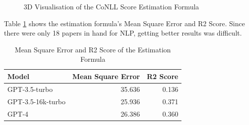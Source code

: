 \begin{figure}[htpb]
  \centering
  \quad 
  \caption[CoNLL Score Estimation]{3D Visualisation of the CoNLL Score Estimation Formula}\label{fig:esimated-conll}
\end{figure}

Table \ref{tab:mse-r2} shows the estimation formula's Mean Square Error and R2 Score. Since there were only 18 papers in hand for NLP, getting better results was difficult.

\begin{table}[h]
    \centering
    \begin{tabular}{lrr}
        \hline
        Model & Mean Square Error & R2 Score \\
        \hline
        GPT-3.5-turbo & 35.636 & 0.136 \\
        GPT-3.5-16k-turbo & 25.936 & 0.371 \\
        GPT-4 & 26.386 & 0.360 \\
        \hline
    \end{tabular}
    \caption{Mean Square Error and R2 Score of the Estimation Formula}
    \label{tab:mse-r2}
\end{table}

